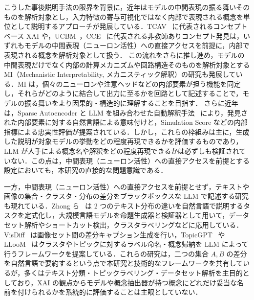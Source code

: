 こうした事後説明手法の限界を背景に，近年はモデルの中間表現の振る舞いそのものを解析対象とし，入力特徴の寄与可視化ではなく内部で表現される概念を単位として説明するアプローチが発展している．TCAV~\cite{kim2018interpretability} に代表されるコンセプトベース XAI や，UCBM~\cite{schrodi2024unsupervised}，CCE~\cite{stein2024towards} に代表される非教師ありコンセプト発見は，いずれもモデルの中間表現（ニューロン活性）への直接アクセスを前提に，内部で表現される概念を解析対象として扱う．
この流れをさらに推し進め，モデルの中間表現だけでなく内部の計算メカニズムや回路構造そのものを解析対象とするMI（Mechanistic Interpretability, メカニスティック解釈）の研究も発展している．MI は，個々のニューロンや注意ヘッドなどの内部要素が担う機能を同定し，それらがどのように結合して出力に至るかを回路として記述することで，モデルの振る舞いをより因果的・構造的に理解することを目指す．
さらに近年は，Sparse Autoencoder と LLM を組み合わせた自動解釈手法~\cite{openai2023neurons,bills2023automatedinterp} により，発見された内部要素に対する自然言語による意味付けと，Simulation Score などの内部指標による忠実性評価が提案されている．しかし，これらの枠組みは主に，生成した説明が対象モデルの挙動をどの程度再現できるかを評価するものであり，LLM が人手による概念名や解釈をどの程度再現できるかは必ずしも検証されていない．この点は，中間表現（ニューロン活性）への直接アクセスを前提とする設定においても，本研究の直接的な問題意識である．

一方，中間表現（ニューロン活性）への直接アクセスを前提とせず，テキストや画像の集合・クラスタ・分布の差分をブラックボックスな LLM で記述する研究も現れている．Zhong ら~\cite{zhong2022describing} は 2 つのテキスト分布の違いを自然言語で説明するタスクを定式化し，大規模言語モデルを命題生成器と検証器として用いて，データセット解析やショートカット検出，クラスタラベリングなどに応用している．VisDiff~\cite{dunlap2024visdiff} は画像セット間の差分キャプション生成を行い，TopicGPT~\cite{pham2024topicgpt} や LLooM~\cite{lam2024lloom} はクラスタやトピックに対するラベル命名・概念帰納を LLM によって行うフレームワークを提案している．これらの研究は，二つの集合 $A,B$ の差分を自然言語で要約するという点で本研究と技術的なフレームワークを共有しているが，多くはテキスト分類・トピックラベリング・データセット解析を主目的としており，XAI の観点からモデルや概念抽出器が持つ概念にどれだけ妥当な名前を付けられるかを系統的に評価することは主眼としていない．


